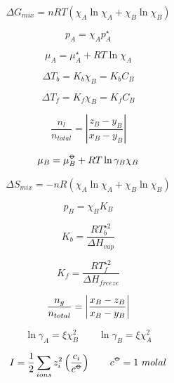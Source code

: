 \documentclass[12pt, letterpaper]{memoir}
\begin{document}
\noindent
\begin{minipage}[t]{0.5\linewidth}
	\begin{equation*}
		\Delta G_{mix} = nRT\left(\chi_A\ln\chi_A+\chi_B\ln\chi_B\right)
	\end{equation*}
	
	\begin{equation*}
		p_A=\chi_Ap^{\star}_A
	\end{equation*}
	
	\begin{equation*}
		\mu_A=\mu_A^{\star}+RT\ln\chi_A
	\end{equation*}
	
	\begin{equation*}
		\Delta T_b=K_b\chi_B = K_bC_B
	\end{equation*}
	
	\begin{equation*}
		\Delta T_f=K_f\chi_B=K_fC_B
	\end{equation*}
	
	\begin{equation*}
		\frac{n_l}{n_{total}}=\left|\frac{z_B-y_B}{x_B-y_B}\right|
	\end{equation*}
	
	\begin{equation*}
		\mu_B=\mu^{\std}_B+RT\ln\gamma_B\chi_B
	\end{equation*}
\end{minipage}
\begin{minipage}[t]{0.5\linewidth}
	\begin{equation*}
		\Delta S_{mix} = -nR\left(\chi_A\ln\chi_A+\chi_B\ln\chi_B\right)
	\end{equation*}
	
	\begin{equation*}
		p_B=\chi_BK_B
	\end{equation*}
	
	\begin{equation*}
		K_b=\frac{RT^{\star 2}_b}{\Delta H_{vap}}
	\end{equation*}
	
	\begin{equation*}
		K_f=\frac{RT^{\star 2}_f}{\Delta H_{freeze}}
	\end{equation*}
	
	\begin{equation*}
		\frac{n_g}{n_{total}}=\left| \frac{x_B-z_B}{x_B-y_B} \right|
	\end{equation*}
	
	\begin{equation*}
		\ln\gamma_A=\xi\chi_B^2 \hspace{2em} \ln\gamma_B=\xi\chi_A^2
	\end{equation*}
	
	\begin{equation*}
		I = \frac{1}{2}\sum\limits_{ions}z_i^2\left(\frac{c_i}{c^{\std}}\right) \hspace{2em} c^{\std}=1~molal
	\end{equation*}
	
\end{minipage}
\end{document}
